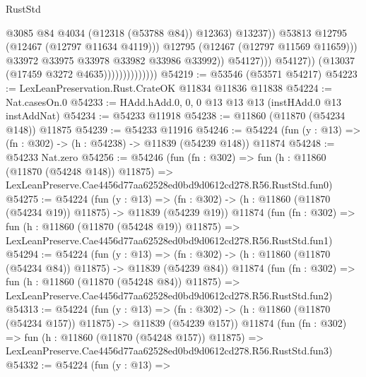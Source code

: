 \begin{lexlean}{RustStd}
\begin{coremodule}
                                                    @3085
                                                    @84
                                                    @4034
                                                    (@12318 (@53788 @84))
                                                    @12363)
                                                  @13237))
                                              @53813
                                              @12795
                                              (@12467 (@12797 @11634 @4119)))
                                            @12795
                                            (@12467 (@12797 @11569 @11659)))
                                          @33972
                                          @33975
                                          @33978
                                          @33982
                                          @33986
                                          @33992))
                                      @54127)))
                                @54127))
                            (@13037 (@17459 @3272 @4635))))))))))))))
@54219 := @53546 (@53571 @54217)
@54223 := LexLeanPreservation.Rust.CrateOK @11834 @11836 @11838
@54224 := Nat.casesOn.{0}
@54233 := HAdd.hAdd.{0, 0, 0} @13 @13 @13 (instHAdd.{0} @13 instAddNat)
@54234 := @54233 @11918
@54238 := @11860 (@11870 (@54234 @148)) @11875
@54239 := @54233 @11916
@54246 := @54224 (fun (y : @13) => (fn : @302) -> (h : @54238) -> @11839 (@54239 @148)) @11874
@54248 := @54233 Nat.zero
@54256 := @54246
    (fun (fn : @302) =>
    fun (h : @11860 (@11870 (@54248 @148)) @11875) =>
    LexLeanPreserve.Cae4456d77aa62528ed0bd9d0612cd278.R56.RustStd.fun0)
@54275 := @54224
    (fun (y : @13) =>
    (fn : @302) -> (h : @11860 (@11870 (@54234 @19)) @11875) -> @11839 (@54239 @19))
    @11874
    (fun (fn : @302) =>
    fun (h : @11860 (@11870 (@54248 @19)) @11875) =>
    LexLeanPreserve.Cae4456d77aa62528ed0bd9d0612cd278.R56.RustStd.fun1)
@54294 := @54224
    (fun (y : @13) =>
    (fn : @302) -> (h : @11860 (@11870 (@54234 @84)) @11875) -> @11839 (@54239 @84))
    @11874
    (fun (fn : @302) =>
    fun (h : @11860 (@11870 (@54248 @84)) @11875) =>
    LexLeanPreserve.Cae4456d77aa62528ed0bd9d0612cd278.R56.RustStd.fun2)
@54313 := @54224
    (fun (y : @13) =>
    (fn : @302) -> (h : @11860 (@11870 (@54234 @157)) @11875) -> @11839 (@54239 @157))
    @11874
    (fun (fn : @302) =>
    fun (h : @11860 (@11870 (@54248 @157)) @11875) =>
    LexLeanPreserve.Cae4456d77aa62528ed0bd9d0612cd278.R56.RustStd.fun3)
@54332 := @54224
    (fun (y : @13) =>

\end{coremodule}
\end{lexlean}
